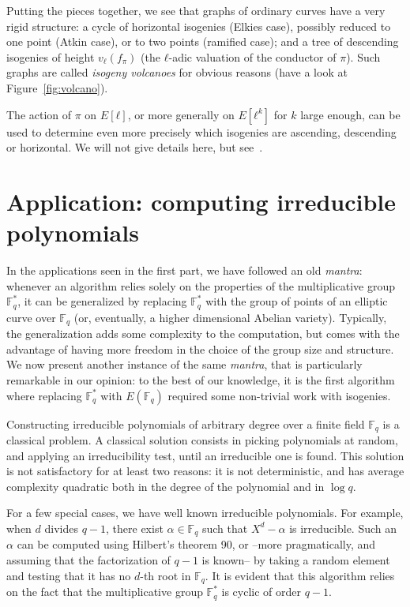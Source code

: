 \documentclass[10pt]{article}
\theoremstyle{plain}
\theoremstyle{definition}
\def\F{\ensuremath{\mathbb{F}}}
\begin{document}
Putting the pieces together, we see that graphs of ordinary curves
have a very rigid structure: a cycle of horizontal isogenies (Elkies
case), possibly reduced to one point (Atkin case), or to two points
(ramified case); and a tree of descending isogenies of height
$v_ℓ(f_π)$ (the $ℓ$-adic valuation of the conductor of $π$). %
Such graphs are called \emph{isogeny volcanoes} for obvious reasons
(have a look at Figure~\ref{fig:volcano}).

The action of $π$ on $E[ℓ]$, or more generally on $E[ℓ^k]$ for $k$
large enough, can be used to determine even more precisely which
isogenies are ascending, descending or horizontal. %
We will not give details here, but
see~\cite{MiretMRV05,MiretMSTV06,IonicaJ10,ionica+joux13,defeo2016explicit}.


\section{Application: computing irreducible polynomials }

In the applications seen in the first part, we have followed an old
\emph{mantra}: whenever an algorithm relies solely on the properties
of the multiplicative group $\F_q^*$, it can be generalized by
replacing $\F_q^*$ with the group of points of an elliptic curve over
$\F_q$ (or, eventually, a higher dimensional Abelian variety). %
Typically, the generalization adds some complexity to the computation,
but comes with the advantage of having more freedom in the choice of
the group size and structure. %
We now present another instance of the same \emph{mantra}, that is
particularly remarkable in our opinion: to the best of our knowledge,
it is the first algorithm where replacing $\F_q^*$ with $E(\F_q)$
required some non-trivial work with isogenies.

Constructing irreducible polynomials of arbitrary degree over a finite
field $\F_q$ is a classical problem. %
A classical solution consists in picking polynomials at random, and
applying an irreducibility test, until an irreducible one is found. %
This solution is not satisfactory for at least two reasons: it is not
deterministic, and has average complexity quadratic both in the degree
of the polynomial and in $\log q$.

For a few special cases, we have well known irreducible polynomials. %
For example, when $d$ divides $q-1$, there exist $α∈\F_q$ such that
$X^d-α$ is irreducible. %
Such an $α$ can be computed using Hilbert's theorem 90, or --more
pragmatically, and assuming that the factorization of $q-1$ is known--
by taking a random element and testing that it has no $d$-th root in
$\F_q$. %
It is evident that this algorithm relies on the fact that the
multiplicative group $\F_q^*$ is cyclic of order $q-1$.
\end{document}
